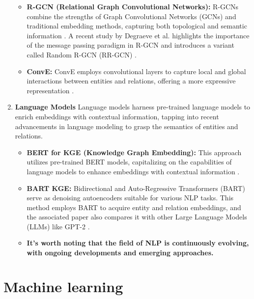 \begin{enumerate}
\begin{itemize}
            \item \textbf{R-GCN (Relational Graph Convolutional Networks):} R-GCNs combine the strengths of Graph Convolutional Networks (GCNs) and traditional embedding methods, capturing both topological and semantic information \cite{schlichtkrull_modeling_2018}. A recent study by Degraeve et al. highlights the importance of the message passing paradigm in R-GCN and introduces a variant called Random R-GCN (RR-GCN) \cite{degraeve_r-gcn_2022}.
            
            \item \textbf{ConvE:} ConvE employs convolutional layers to capture local and global interactions between entities and relations, offering a more expressive representation \cite{hogan_knowledge_2022}.
        \end{itemize}

        \item \textbf{Language Models}
        Language models harness pre-trained language models to enrich embeddings with contextual information, tapping into recent advancements in language modeling to grasp the semantics of entities and relations.

        \begin{itemize}
            \item \textbf{BERT for KGE (Knowledge Graph Embedding):} This approach utilizes pre-trained BERT models, capitalizing on the capabilities of language models to enhance embeddings with contextual information \cite{yao_kg-bert_2019}.
            
            \item \textbf{BART KGE:} Bidirectional and Auto-Regressive Transformers (BART) serve as denoising autoencoders suitable for various NLP tasks. This method employs BART to acquire entity and relation embeddings, and the associated paper also compares it with other Large Language Models (LLMs) like GPT-2 \cite{liu_kg-bart_2021}.
            
            \item \textbf{It's worth noting that the field of NLP is continuously evolving, with ongoing developments and emerging approaches.}
        \end{itemize}
    \end{enumerate}


\section{Machine learning}\label{seq:background:machine_learning}
